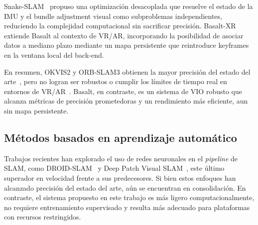Snake-SLAM~\cite{ruckert2021snakeslam} propuso una optimización desacoplada que resuelve el estado de la IMU y el bundle adjustment visual como subproblemas independientes, reduciendo la complejidad computacional sin sacrificar precisión.
Basalt-XR~\cite{zanotti2024basaltxr} extiende Basalt al contexto de VR/AR, incorporando la posibilidad de asociar datos a mediano plazo mediante un mapa persistente que reintroduce keyframes en la ventana local del back-end.

En resumen, OKVIS2 y ORB-SLAM3 obtienen la mayor precisión del estado del arte~\cite{krishnan2025lamaria,leutenegger2022okvis2}, pero no logran ser robustos o cumplir los límites de tiempo real en entornos de VR/AR~\cite{demayo2025monadoslamdataset}. Basalt, en contraste, es un sistema de VIO robusto que alcanza métricas de precisión prometedoras y un rendimiento más eficiente, aun sin mapa persistente.

\subsection{Métodos basados en aprendizaje automático}
\label{subsec:learning_based}

Trabajos recientes han explorado el uso de redes neuronales en el \emph{pipeline} de SLAM, como DROID-SLAM~\cite{teed2021droid} y Deep Patch Visual SLAM~\cite{lipson2024dpvslam}, este último superador en velocidad frente a sus predecesores.
Si bien estos enfoques han alcanzado precisión del estado del arte, aún se encuentran en consolidación.
En contraste, el sistema propuesto en este trabajo es más ligero computacionalmente, no requiere entrenamiento supervisado y resulta más adecuado para plataformas con recursos restringidos.
